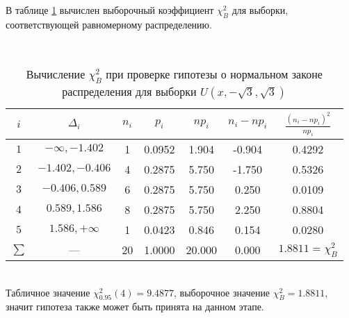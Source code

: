 \documentclass[12pt]{article}
\begin{document}
В таблице \ref{chiUni} вычислен выборочный коэффициент $\chi^2_B$ для выборки, соответствующей равномерному распределению.\\
\begin{table}[h!]
    \begin{center}
        \caption{Вычисление $\chi^2_B$ при проверке гипотезы о нормальном законе распределения для выборки $U(x,-\sqrt{3},\sqrt{3})$}
        \phantom{0}\\
        \begin{tabular}{|c|c|c|c|c|c|c|}\hline
            $i$ & $\Delta_i$ & $n_i$ & $p_i$ & $np_i$ & $n_i - np_i$ & $\frac{(n_i-np_i)^2}{np_i}$\\
            \hline
            $1$ & $-\infty, -1.402$ & 1 & 0.0952 & 1.904 & -0.904 & 0.4292\\
            \hline
            $2$ & $-1.402, -0.406$ & 4 & 0.2875 & 5.750 & -1.750 & 0.5326\\
            \hline
            $3$ & $-0.406, 0.589$ & 6 & 0.2875 & 5.750 & 0.250 & 0.0109\\
            \hline
            $4$ & $0.589, 1.586$ & 8 & 0.2875 & 5.750 & 2.250 & 0.8804\\
            \hline
            $5$ & $1.586, +\infty$ & 1 & 0.0423 & 0.846 & 0.154 & 0.0280\\
            \hline
            $\sum$ & --- & 20 & 1.0000 & 20.000 & 0.000 & $1.8811 = \chi^2_B$\\
            \hline
        \end{tabular}
    \label{chiUni}
    \end{center}
\end{table}
\phantom{0}\\
Табличное значение $\chi^2_{0.95}(4) = 9.4877$, выборочное значение $\chi^2_B = 1.8811$, значит гипотеза также может быть принята на данном этапе.\\
\end{document}
